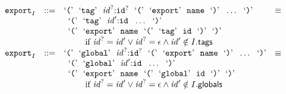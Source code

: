 $$
\begin{array}[t]{@{}lrrl@{}l@{}l@{}l@{}}
& {{\mathtt{export}}}_{I} & ::= & \mbox{‘\texttt{{(}}’}~~\mbox{‘\texttt{tag}’}~~{{\mathit{id}}^?}{:}{{\mathtt{id}}^?}~~\mbox{‘\texttt{{(}}’}~~\mbox{‘\texttt{export}’}~~{\mathtt{name}}~~\mbox{‘\texttt{{)}}’}~~\ldots~~\mbox{‘\texttt{{)}}’} & \quad\equiv\quad{} & & \\
&&& \multicolumn{4}{@{}l@{}}{\quad
\begin{array}[t]{@{}l@{}l@{}l@{}}
\begin{array}[t]{@{}l@{}} \mbox{‘\texttt{{(}}’}~~\mbox{‘\texttt{tag}’}~~{\mathit{id}'}{:}{\mathtt{id}}~~\ldots~~\mbox{‘\texttt{{)}}’} \\
  \mbox{‘\texttt{{(}}’}~~\mbox{‘\texttt{export}’}~~{\mathtt{name}}~~\mbox{‘\texttt{{(}}’}~~\mbox{‘\texttt{tag}’}~~{\mathtt{id}}~~\mbox{‘\texttt{{)}}’}~~\mbox{‘\texttt{{)}}’} \end{array} & & \\
 \multicolumn{3}{@{}l@{}}{\quad
\begin{array}[t]{@{}l@{}}
\quad \mbox{if}~ {{\mathit{id}}^?} = {\mathit{id}'} \lor {{\mathit{id}}^?} = \epsilon \land {\mathit{id}'} \notin I{.}\mathsf{tags} \\
\end{array}
} \\
\end{array}
} \\
& {{\mathtt{export}}}_{I} & ::= & \mbox{‘\texttt{{(}}’}~~\mbox{‘\texttt{global}’}~~{{\mathit{id}}^?}{:}{{\mathtt{id}}^?}~~\mbox{‘\texttt{{(}}’}~~\mbox{‘\texttt{export}’}~~{\mathtt{name}}~~\mbox{‘\texttt{{)}}’}~~\ldots~~\mbox{‘\texttt{{)}}’} & \quad\equiv\quad{} & & \\
&&& \multicolumn{4}{@{}l@{}}{\quad
\begin{array}[t]{@{}l@{}l@{}l@{}}
\begin{array}[t]{@{}l@{}} \mbox{‘\texttt{{(}}’}~~\mbox{‘\texttt{global}’}~~{\mathit{id}'}{:}{\mathtt{id}}~~\ldots~~\mbox{‘\texttt{{)}}’} \\
  \mbox{‘\texttt{{(}}’}~~\mbox{‘\texttt{export}’}~~{\mathtt{name}}~~\mbox{‘\texttt{{(}}’}~~\mbox{‘\texttt{global}’}~~{\mathtt{id}}~~\mbox{‘\texttt{{)}}’}~~\mbox{‘\texttt{{)}}’} \end{array} & & \\
 \multicolumn{3}{@{}l@{}}{\quad
\begin{array}[t]{@{}l@{}}
\quad \mbox{if}~ {{\mathit{id}}^?} = {\mathit{id}'} \lor {{\mathit{id}}^?} = \epsilon \land {\mathit{id}'} \notin I{.}\mathsf{globals} \\

\end{array}}
\end{array}}
\end{array}$$
